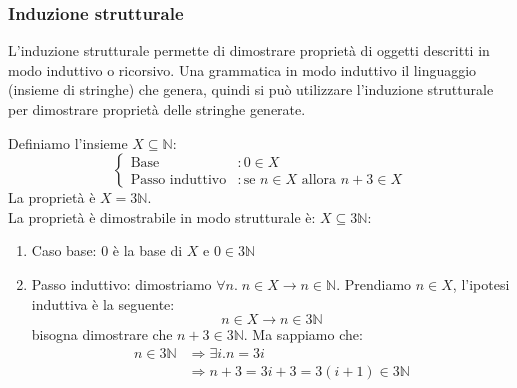 \documentclass[a4paper]{article}
\begin{document}
\subsubsection{Induzione strutturale}

L'induzione strutturale permette di dimostrare proprietà di oggetti descritti in 
modo induttivo o ricorsivo. Una grammatica in modo induttivo il linguaggio (insieme
di stringhe) che genera, quindi si può utilizzare l'induzione strutturale per dimostrare 
proprietà delle stringhe generate.

\begin{Example}{}{}
    Definiamo l'insieme $X \subseteq \mathbb{N}$:
    \[
    \begin{cases}
        \text{Base} & : 0 \in X \\
        \text{Passo induttivo} & : \text{se } n \in X \text{ allora } n+3 \in X
    \end{cases}
    \]
    La proprietà è $X = 3\mathbb{N}$.\\
    La proprietà è dimostrabile in modo strutturale è: $X \subseteq 3\mathbb{N}$: 
    \begin{enumerate}
        \item Caso base: 0 è la base di $X$ e $0 \in 3\mathbb{N}$ 
        \item Passo induttivo: dimostriamo $\forall n. \; n \in X \rightarrow n \in \mathbb{N}$.
        Prendiamo $n \in X$, l'ipotesi induttiva è la seguente:
        \[
            n \in X \rightarrow n \in 3\mathbb{N}
        \]
        bisogna dimostrare che $n+3 \in 3\mathbb{N}$. Ma sappiamo che:
        \[
        \begin{aligned}
            n \in 3\mathbb{N} &\Rightarrow \exists i. n = 3i\\
            &\Rightarrow n + 3 = 3i + 3 = 3(i+1) \in 3\mathbb{N}
        \end{aligned}
        \]
    \end{enumerate}
\end{Example}
\end{document}
